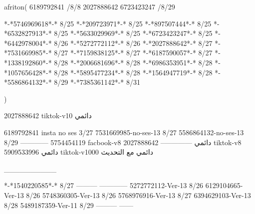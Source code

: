 afriton(
6189792841 /8/8
2027888642
6723423247 /8/29

*-*5746969618*-* 8/25
*-*209723971*-* 8/25
*-*897507444*-* 8/25
*-*6532827913*-* 8/25
*-*5633029969*-* 8/25
*-*6723423247*-* 8/25
*-*6442978004*-* 8/26
*-*5272772112*-* 8/26
*-*2027888642*-* 8/27
*-*7531669985*-* 8/27
*-*7159838125*-* 8/27
*-*6187590057*-* 8/27
*-*1338192860*-* 8/28
*-*2006681696*-* 8/28
*-*6986353951*-* 8/28
*-*1057656428*-* 8/28
*-*5895477234*-* 8/28
*-*1564947719*-* 8/28
*-*5586864132*-* 8/29
*-*7385361142*-* 8/31

)

2027888642 tiktok-v10
دائمي

6189792841 insta no ses
3/27
7531669985-no-ses-13
8/27
5586864132-no-ses-13
8/29
------------
5754454119 facbook-v8
دائمي
--------------
2027888642 tiktok-v8
دائمي
5909533996 tiktok-v1000
دائمي مع التحديث

__________

*-*1540220585*-* 8/27
---------
------------
5272772112-Ver-13
8/26
6129104665-Ver-13
8/26
5748360305-Ver-13
8/26
5768976916-Ver-13
8/27
6394629103-Ver-13
8/28
5489187359-Ver-11
8/29
---------
------
